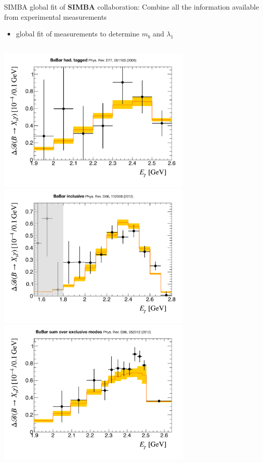 \documentclass[xcolor=dvipsnames]{beamer}
\begin{document}
   \begin{frame}{SIMBA global fit of \BtoXsgamma}
      \scriptsize
      \textbf{SIMBA} collaboration: 
      Combine all the information available from experimental measurements
      \begin{itemize}
       \item[\ra] global fit of \BtoXsgamma measurements to determine $m_b$ and $\lambda_1$
      \end{itemize}

      \begin{columns}
         \centering
         \includegraphics[width=0.7\textwidth]{figures/babar_hadtag_spec_default_la055_a3.pdf}
         \includegraphics[width=0.7\textwidth]{figures/babar_incl_spec_default_la055_a3.pdf}
         \includegraphics[width=0.7\textwidth]{figures/babar_sem_spec_default_la055_a3.pdf}

\end{columns}
\end{frame}
\end{document}
